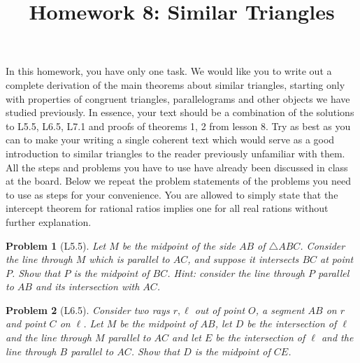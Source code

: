 \documentclass[a4paper,12pt]{article}
\title{Homework 8: Similar Triangles}
\theoremstyle{perfect}
\newtheorem{prb}{Problem}
\begin{document}
 
\maketitle

\noindent In this homework, you have only one task. We would like you to write out a complete derivation of the main theorems about similar triangles, starting only with properties of congruent triangles, parallelograms and other objects we have studied previously. In essence, your text should be a combination of the solutions to L5.5, L6.5, L7.1 and proofs of theorems 1, 2 from lesson 8. Try as best as you can to make your writing a single coherent text which would serve as a good introduction to similar triangles to the reader previously unfamiliar with them. All the steps and problems you have to use have already been discussed in class at the board. Below we repeat the problem statements of the problems you need to use as steps for your convenience. You are allowed to simply state that the intercept theorem for rational ratios implies one for all real rations without further explanation. 

\begin{prb}[L5.5]
Let $M$ be the midpoint of the side $AB$ of $\triangle ABC$. Consider the line through $M$ which is parallel to $AC$, and suppose it intersects $BC$ at point $P$. Show that $P$ is the midpoint of $BC$. \textit{Hint: consider the line through $P$ parallel to $AB$ and its intersection with $AC$. }
\end{prb}

\begin{prb}[L6.5]
Consider two rays $r, \ell$ out of point $O$, a segment $AB$ on $r$ and point $C$ on $\ell$. Let $M$ be the midpoint of $AB$, let $D$ be the intersection of $\ell$ and the line through $M$ parallel to $AC$ and let $E$ be the intersection of $\ell$ and the line through $B$ parallel to $AC$. Show that $D$ is the midpoint of $CE$. 
\end{prb}
\end{document}
